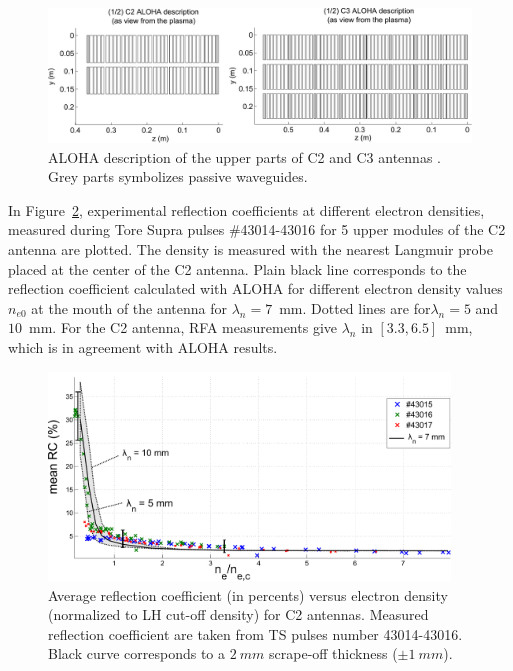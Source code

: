 \begin{figure}[h]
	\centering
	\includegraphics[width=1.0\textwidth]{figures/chap2/Tore_Supra/geometry_TS_LHAntennas}
	\caption{ALOHA description of the upper parts of C2 and C3 antennas . Grey parts symbolizes passive waveguides.}
	\label{fig:geometry_TS_LHAntennas}
\end{figure}

In Figure~\ref{fig:MarkI_mean_RC}, experimental reflection coefficients at different electron densities, measured during Tore Supra pulses \#43014-43016 for 5 upper modules of the C2 antenna are plotted. The density is measured with the nearest Langmuir probe placed at the center of the C2 antenna. Plain black line corresponds to the reflection coefficient calculated with ALOHA for different electron density values $n_{e0}$ at the mouth of the antenna for $\lambda_n=7$~mm. Dotted lines are for$\lambda_n=5$ and $10$~mm. For the C2 antenna, RFA measurements give $\lambda_n$ in $[3.3, 6.5]$~mm, which is in agreement with ALOHA results. 

\begin{figure}[h]
	\centering
	\includegraphics[width=0.95\textwidth]{figures/chap2/Tore_Supra/C2_mean_CR_modBas}
	\caption{Average reflection  coefficient (in percents) versus electron density (normalized to LH cut-off density) for C2 antennas. Measured reflection  coefficient are taken from TS pulses number 43014-43016. Black curve corresponds to a $2~mm$ scrape-off thickness ($\pm 1~mm$).}
	\label{fig:MarkI_mean_RC}
\end{figure}


